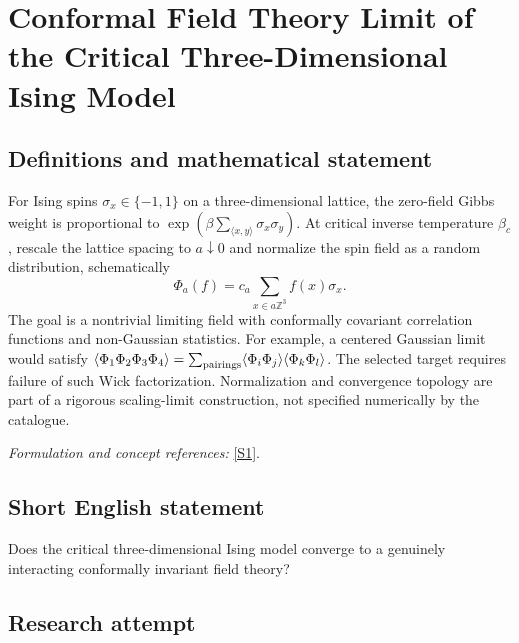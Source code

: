 \documentclass[11pt,a4paper]{article}
\newcommand{\Z}{\mathbb{Z}}
\newcommand{\sref}[2]{\hyperlink{source:#1:#2}{[S#2]}}
\newif\ifshowcatalogue
\newcommand{\cataloguescope}[1]{\ifshowcatalogue
 \paragraph{Exact scope in the supplied catalogue.}
 \begin{quote}\small #1\end{quote}\fi}
\numberwithin{equation}{section}
\begin{document}
\setcounter{section}{41}
\clearpage
\section{\texorpdfstring{Conformal Field Theory Limit of the Critical Three-Dimensional Ising Model}{Conformal Field Theory Limit of the Critical Three-Dimensional Ising Model}}\label{42}
\subsection{Definitions and mathematical statement}
For Ising spins $\sigma_x\in\{-1,1\}$ on a three-dimensional lattice, the zero-field Gibbs weight is proportional to $\exp(\beta\sum_{\langle x,y\rangle}\sigma_x\sigma_y)$. At critical inverse temperature $\beta_c$, rescale the lattice spacing to $a\downarrow0$ and normalize the spin field as a random distribution, schematically
\[
 \Phi_a(f)=c_a\sum_{x\in a\Z^3}f(x)\sigma_x.
\]
The goal is a nontrivial limiting field with conformally covariant correlation functions and non-Gaussian statistics. For example, a centered Gaussian limit would satisfy $\langle\Phi_1\Phi_2\Phi_3\Phi_4\rangle=\sum_{\rm pairings}\langle\Phi_i\Phi_j\rangle\langle\Phi_k\Phi_l\rangle$. The selected target requires failure of such Wick factorization. Normalization and convergence topology are part of a rigorous scaling-limit construction, not specified numerically by the catalogue.
\par\smallskip\textit{Formulation and concept references:} \sref{42}{1}.
\cataloguescope{Prove that the scaling limit of the critical three-dimensional Ising model exists and is conformally invariant, with a non-Gaussian spin field whose limiting spin correlations do not factorize according to Wick's rule.}
\subsection{Short English statement}
Does the critical three-dimensional Ising model converge to a genuinely interacting conformally invariant field theory?
\subsection{Research attempt}
\end{document}
